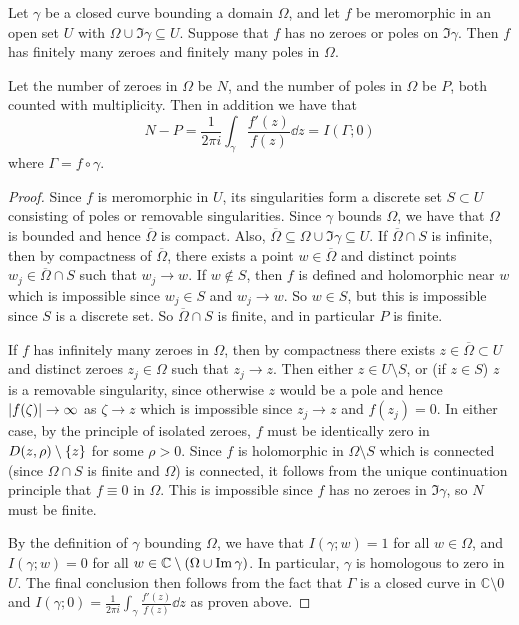 \begin{corollary}
	Let \( \gamma \) be a closed curve bounding a domain \( \Omega \), and let \( f \) be meromorphic in an open set \( U \) with \( \Omega \cup \Im \gamma \subseteq U \).
	Suppose that \( f \) has no zeroes or poles on \( \Im \gamma \).
	Then \( f \) has finitely many zeroes and finitely many poles in \( \Omega \).

	Let the number of zeroes in \( \Omega \) be \( N \), and the number of poles in \( \Omega \) be \( P \), both counted with multiplicity.
	Then in addition we have that
	\[
		N - P = \frac{1}{2 \pi i} \int_\gamma \frac{f'(z)}{f(z)} \dd{z} = I(\Gamma;0)
	\]
	where \( \Gamma = f \circ \gamma \).
\end{corollary}
\begin{proof}
	Since \( f \) is meromorphic in \( U \), its singularities form a discrete set \( S \subset U \) consisting of poles or removable singularities.
	Since \( \gamma \) bounds \( \Omega \), we have that \( \Omega \) is bounded and hence \( \overline \Omega \) is compact.
	Also, \( \overline \Omega \subseteq \Omega \cup \Im \gamma \subseteq U \).
	If \( \overline \Omega \cap S \) is infinite, then by compactness of \( \overline \Omega \), there exists a point \( w \in \overline \Omega \) and distinct points \( w_j \in \overline \Omega \cap S \) such that \( w_j \to w \).
	If \( w \not\in S \), then \( f \) is defined and holomorphic near \( w \) which is impossible since \( w_j \in S \) and \( w_j \to w \).
	So \( w \in S \), but this is impossible since \( S \) is a discrete set.
	So \( \overline \Omega \cap S \) is finite, and in particular \( P \) is finite.

	If \( f \) has infinitely many zeroes in \( \Omega \), then by compactness there exists \( z \in \overline \Omega \subset U \) and distinct zeroes \( z_j \in \Omega \) such that \( z_j \to z \).
	Then either \( z \in U \setminus S \), or (if \( z \in S \)) \( z \) is a removable singularity, since otherwise \( z \) would be a pole and hence \( \abs{f(\zeta)} \to \infty \) as \( \zeta \to z \) which is impossible since \( z_j \to z \) and \( f(z_j) = 0 \).
	In either case, by the principle of isolated zeroes, \( f \) must be identically zero in \( D(z,\rho) \setminus \qty{z} \) for some \( \rho > 0 \).
	Since \( f \) is holomorphic in \( \Omega \setminus S \) which is connected (since \( \Omega \cap S \) is finite and \( \Omega \)) is connected, it follows from the unique continuation principle that \( f \equiv 0 \) in \( \Omega \).
	This is impossible since \( f \) has no zeroes in \( \Im \gamma \), so \( N \) must be finite.

	By the definition of \( \gamma \) bounding \( \Omega \), we have that \( I(\gamma;w) = 1 \) for all \( w \in \Omega \), and \( I(\gamma;w) = 0 \) for all \( w \in \mathbb C \setminus \qty(\Omega \cup \Im \gamma) \).
	In particular, \( \gamma \) is homologous to zero in \( U \).
	The final conclusion then follows from the fact that \( \Gamma \) is a closed curve in \( \mathbb C \setminus \qty{0} \) and \( I(\gamma;0) = \frac{1}{2\pi i} \int_\gamma \frac{f'(z)}{f(z)} \dd{z} \) as proven above.
\end{proof}

